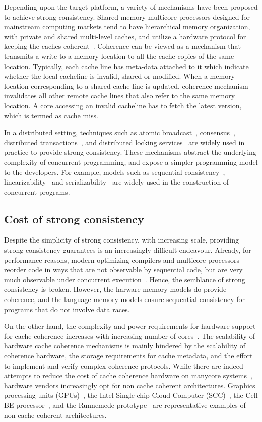 Depending upon the target platform, a variety of mechanisms have been proposed
to achieve strong consistency. Shared memory multicore processors designed for
mainstream computing markets tend to have hierarchical memory organization,
with private and shared multi-level caches, and utilize a hardware protocol for
keeping the caches coherent~\cite{Martin2012}. Coherence can be viewed as a
mechanism that transmits a write to a memory location to all the cache copies
of the same location. Typically, each cache line has meta-data attached to it
which indicate whether the local cacheline is invalid, shared or modified. When
a memory location corresponding to a shared cache line is updated, coherence
mechanism invalidates all other remote cache lines that also refer to the same
memory location. A core accessing an invalid cacheline has to fetch the latest
version, which is termed as cache miss.

In a distributed setting, techniques such as atomic
broadcast~\cite{Defago2004}, consensus~\cite{Lamport98}, distributed
transactions~\cite{Traiger1982}, and distributed locking
services~\cite{Burrows2006} are widely used in practice to provide strong
consistency. These mechanisms abstract the underlying complexity of concurrent
programming, and expose a simpler programming model to the developers. For
example, models such as sequential consistency~\cite{Lam79},
linearizability~\cite{Herlihy1990} and serializability~\cite{Serializability}
are widely used in the construction of concurrent programs.

\subsection{Cost of strong consistency}

Despite the simplicity of strong consistency, with increasing scale, providing
strong consistency guarantees is an increasingly difficult endeavour. Already,
for performance reasons, modern optimizing compilers and multicore processors
reorder code in ways that are not observable by sequential code, but are very
much observable under concurrent
execution~\cite{Demange2013,Sewell2010,Sarkar2011,Batty2011}. Hence, the
semblance of strong consistency is broken. However, the harware memory models
do provide coherence, and the language memory models ensure sequential
consistency for programs that do not involve data races.

On the other hand, the complexity and power requirements for hardware support
for cache coherence increases with increasing number of
cores~\cite{Kavadias2010}. The scalability of hardware cache coherence
mechanisms is mainly hindered by the scalability of coherence hardware, the
storage requirements for cache metadata, and the effort to implement and verify
complex coherence protocols. While there are indeed attempts to reduce the cost
of cache coherence hardware on manycore systems~\cite{Martin2012}, hardware
vendors increasingly opt for non cache coherent architectures. Graphics
processing units (GPUs)~\cite{Luebke2004}, the Intel Single-chip Cloud Computer
(SCC)~\cite{Mattson2010}, the Cell BE processor~\cite{Kahle2005}, and the
Runnemede prototype~\cite{Carter2013} are representative examples of non cache
coherent architectures.

